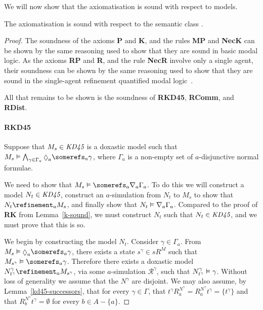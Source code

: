 We will now show that the axiomatisation is sound with respect to \classKD{}
models.

\begin{lemma}\label{kd45-sound}
The axiomatisation \axiomKDF{} is sound with respect to the semantic class
\classKD{}.
\end{lemma}

\begin{proof}
The soundness of the axioms {\bf P} and {\bf K}, and the rules {\bf MP} and
{\bf NecK} can be shown by the same reasoning used to show that they are sound
in basic modal logic. As the axioms {\bf RP} and {\bf R}, and the rule {\bf
NecR} involve only a single agent, their soundness can be shown by the same
reasoning used to show that they are sound in the single-agent refinement
quantified modal logic~\cite{french2010future}.

All that remains to be shown is the soundness of {\bf RKD45}, {\bf RComm}, and
{\bf RDist}.

\paragraph{RKD45}
Suppose that $M_s \in \textit{KD45}$ is a doxastic model such that $M_s \entails
\bigwedge_{\gamma \in \Gamma_a} \suspects_a \somerefs_a \gamma$, where $\Gamma_a$ is
a non-empty set of $a$-disjunctive normal formulae.

We need to show that $M_s \entails \somerefs_a \covers_a \Gamma_a$. To do this
we will construct a model $N_t \in \textit{KD45}$, construct an $a$-simulation from
$N_t$ to $M_s$ to show that $N_t \refinement_a M_s$, and finally show that $N_t
\vDash \nabla_a \Gamma_a$. Compared to the proof of {\bf RK} from
Lemma~\ref{k-sound}, we must construct $N_t$ such that $N_t \in \textit{KD45}$, and
we must prove that this is so.

We begin by constructing the model $N_t$. Consider $\gamma \in \Gamma_a$. From
$M_s \entails \suspects_a \somerefs_a \gamma$, there exists a state $s^\gamma
\in sR^M$ such that $M_{s^\gamma} \entails \somerefs_a \gamma$. Therefore there
exists a doxastic model $N^\gamma_{t^\gamma} \refinement_a M_{s^\gamma}$, via
some $a$-simulation $\mathcal{R}^\gamma$, such that $N^\gamma_{t^\gamma}
\vDash \gamma$. Without loss of generality we assume that the $N^\gamma$ are
disjoint. We may also assume, by Lemma~\ref{kd45-successors}, that for every
$\gamma \in \Gamma$, that $t^\gamma R^{N^\gamma}_a = R^{N^\gamma}_a t^\gamma =
\{t^\gamma\}$ and that $R^{N^\gamma}_b t^\gamma = \emptyset$ for every $b \in A
- \{a\}$.


\end{proof}
